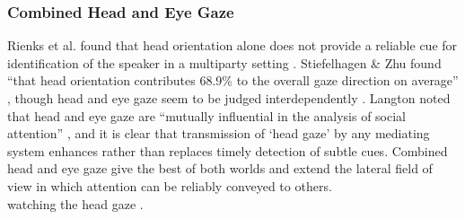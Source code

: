                 \subsubsection{Combined Head and Eye Gaze}
                    Rienks et al. found that head orientation alone does not provide a reliable cue for identification of the speaker in a multiparty setting \cite{Rienks2010}.
                    Stiefelhagen \& Zhu found ``that head orientation contributes 68.9\% to the overall gaze direction on average'' \cite{Stiefelhagen:2002:HOG:506443.506634}, though head and eye gaze seem to be judged interdependently \cite{Kluttz2009}.
                    Langton noted that head and eye gaze are ``mutually influential in the analysis of social attention'' \cite{Langton2000a}, and it is clear that transmission of `head gaze' by any mediating system enhances rather than replaces timely detection of subtle cues. Combined head and eye gaze give the best of both worlds and extend the lateral field of view in which attention can be reliably conveyed to others.\\
                    watching the head gaze \cite{Bailenson2002}.
